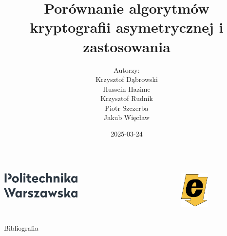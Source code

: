 \documentclass{beamer}
\title{Porównanie algorytmów kryptografii asymetrycznej i zastosowania}
\author{Autorzy:\\ Krzysztof Dąbrowski\\ Hussein Hazime\\ Krzysztof Rudnik\\ Piotr Szczerba\\ Jakub Więcław}
\date{2025-03-24}
\begin{document}
\begin{frame}
    \vspace*{-1cm} %
    \begin{columns}[T]
        \begin{column}{0.2\textwidth}
            \vspace*{5cm}
            \includegraphics[width=4cm]{other_graphics/Politechnika_Warszawska.png}
        \end{column}
        \begin{column}{0.6\textwidth}
            \vspace*{0.5cm}
            \titlepage
        \end{column}
        \begin{column}{0.2\textwidth}
            \vspace*{5cm}
            \includegraphics[width=1.5cm]{other_graphics/Elektryczny.png}
        \end{column}
    \end{columns}
\end{frame}














\begin{frame}{Bibliografia}
\printbibliography
\end{frame}
\end{document}
